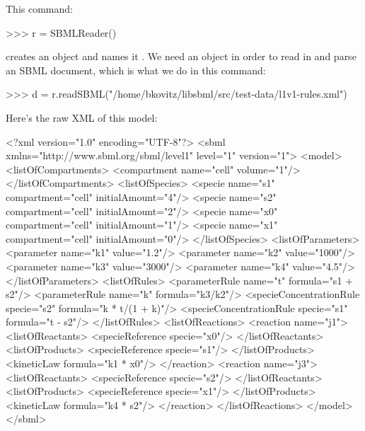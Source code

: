 \documentclass{sbmlmanual}
\begin{document}
This command:

\begin{shellVerbatim}
>>> r = SBMLReader()
\end{shellVerbatim}

creates an  object and names it .  We need an
 object in order to read in and parse an SBML
document, which is what we do in this command:

\begin{shellVerbatim}
>>> d = r.readSBML("/home/bkovitz/libsbml/src/test-data/l1v1-rules.xml")
\end{shellVerbatim}

Here's the raw XML of this model:

\begin{boxedCodeVerbatim}
<?xml version="1.0" encoding="UTF-8"?>
<sbml xmlns="http://www.sbml.org/sbml/level1" level="1" version="1">
  <model>
    <listOfCompartments>
      <compartment name="cell" volume="1"/>
    </listOfCompartments>
    <listOfSpecies>
      <specie name="s1" compartment="cell" initialAmount="4"/>
      <specie name="s2" compartment="cell" initialAmount="2"/>
      <specie name="x0" compartment="cell" initialAmount="1"/>
      <specie name="x1" compartment="cell" initialAmount="0"/>
    </listOfSpecies>
    <listOfParameters>
      <parameter name="k1" value="1.2"/>
      <parameter name="k2" value="1000"/>
      <parameter name="k3" value="3000"/>
      <parameter name="k4" value="4.5"/>
    </listOfParameters>
    <listOfRules>
      <parameterRule name="t" formula="s1 + s2"/>
      <parameterRule name="k" formula="k3/k2"/>
      <specieConcentrationRule specie="s2" formula="k * t/(1 + k)"/>
      <specieConcentrationRule specie="s1" formula="t - s2"/>
    </listOfRules>
    <listOfReactions>
      <reaction name="j1">
        <listOfReactants>
          <specieReference specie="x0"/>
        </listOfReactants>
        <listOfProducts>
          <specieReference specie="s1"/>
        </listOfProducts>
        <kineticLaw formula="k1 * x0"/>
      </reaction>
      <reaction name="j3">
        <listOfReactants>
          <specieReference specie="s2"/>
        </listOfReactants>
        <listOfProducts>
          <specieReference specie="x1"/>
        </listOfProducts>
        <kineticLaw formula="k4 * s2"/>
      </reaction>
    </listOfReactions>
  </model>
</sbml>
\end{boxedCodeVerbatim}

\end{document}
